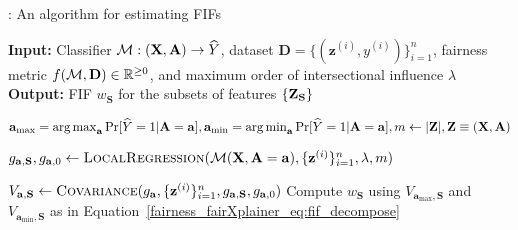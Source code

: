 \begin{algorithm}[t!]
	\small{
	\caption{{\fairXplainer}: An algorithm for estimating FIFs}\label{fairness_fairXplainer_algo:framework}
	\begin{flushleft}
	\hspace*{\algorithmicindent}\textbf{Input:} Classifier $ \mathcal{M}: (\mathbf{X}, \mathbf{A}) \rightarrow \widehat{Y}$, dataset $\mathbf{D} = \{(\mathbf{z}^{(i)}, y^{(i)})\}_{i=1}^n$, fairness metric $f(\mathcal{M}, \mathbf{D}) \in \mathbb{R}^{\geq 0}$, and maximum order of intersectional influence $\lambda $\\
	\hspace*{\algorithmicindent}\textbf{Output:} FIF $ w_{\mathbf{S}}$ for the subsets of features $\{\mathbf{Z}_{\mathbf{S}}\}$
	\end{flushleft}

	\begin{algorithmic}[1]
		\State $ \mathbf{a}_{\max} = \operatorname*{arg\,max}_{\mathbf{a}} \Pr[\widehat{Y} = 1 | \mathbf{A} = \mathbf{a}], \mathbf{a}_{\min} = \operatorname*{arg\,min}_{\mathbf{a}} \Pr[\widehat{Y} = 1 | \mathbf{A} = \mathbf{a}], m \gets    |\mathbf{Z}|, \mathbf{Z} \equiv (\mathbf{X}, \mathbf{A}) $
		\label{fairness_fairXplainer_algo_line:fif_computation_start}
		
		 
		\State $ g_{\mathbf{a}, \mathbf{S}},g_{\mathbf{a}, 0} \gets \textsc{LocalRegression}(\mathcal{M}(\mathbf{X}, \mathbf{A} = \mathbf{a}), \{\mathbf{z}^{(i)}\}_{i=1}^n, \lambda, m) $
		
		\State $ V_{\mathbf{a}, \mathbf{S}} \gets \textsc{Covariance}(g_{\mathbf{a}},  \{\mathbf{z}^{(i)}\}_{i=1}^n, g_{\mathbf{a}, \mathbf{S}},g_{\mathbf{a}, 0}) $
		\EndFor
		\State Compute $ w_{\mathbf{S}}$ using  $V_{\mathbf{a}_{\max},\mathbf{S}}$ and $V_{\mathbf{a}_{\min},\mathbf{S}}$ as in Equation~\eqref{fairness_fairXplainer_eq:fif_decompose}
		\label{fairness_fairXplainer_algo_line:fif_computation_end}
		

\end{algorithmic}}
\end{algorithm}
